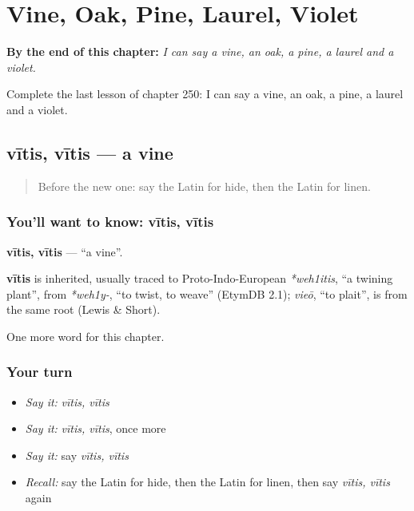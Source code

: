 
\chapter{Vine, Oak, Pine, Laurel, Violet}
\label{ch:la-vine-oak-pine-laurel-violet}

\begin{chapteropening}
\textbf{By the end of this chapter:} \emph{I can say a vine, an oak, a pine, a laurel and a violet.}

Complete the last lesson of chapter 250: I can say a vine, an oak, a pine, a laurel and a violet.
\end{chapteropening}

\section[vītis, vītis]{vītis, vītis — a vine}

\label{lesson:LA-C250-vitis}



\begin{quote}
Before the new one: say the Latin for hide, then the Latin for linen.
\end{quote}

\subsection*{You'll want to know: vītis, vītis}
\textbf{vītis, vītis} — \textquotedblleft{}a vine\textquotedblright{}.

\begin{cousinweb}
\textbf{vītis} is inherited, usually traced to Proto-Indo-European \emph{*weh1itis}, \textquotedblleft{}a twining plant\textquotedblright{}, from \emph{*weh1y-}, \textquotedblleft{}to twist, to weave\textquotedblright{} (EtymDB 2.1); \emph{vieō}, \textquotedblleft{}to plait\textquotedblright{}, is from the same root (Lewis \& Short).
\end{cousinweb}

\begin{grammarlens}[title={What you've built}]
One more word for this chapter.
\end{grammarlens}

\subsection*{Your turn}
\begin{itemize}
\raggedright
  \item \emph{Say it:} \emph{vītis, vītis}
  \item \emph{Say it:} \emph{vītis, vītis}, once more
  \item \emph{Say it:} say \emph{vītis, vītis}
  \item \emph{Recall:} say the Latin for hide, then the Latin for linen, then say \emph{vītis, vītis} again
\end{itemize}


